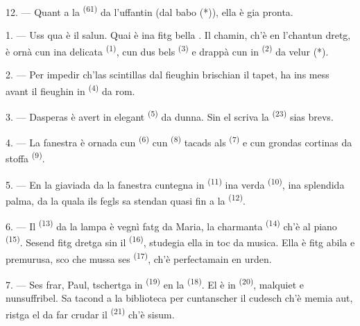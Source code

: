 12. --- Quant a la  \textsuperscript{(61)} da l'uffantin (dal babo (*)),
ella è gia pronta.

\VUsaut{5.0mm}
\VUsaut{3.0mm}

1. --- Uss qua è il salun. Quai è ina fitg bella . Il chamin, ch'è
en l'chantun dretg, è ornà cun ina delicata  \textsuperscript{(1)},
cun dus bels  \textsuperscript{(3)} e drappà cun in 
\textsuperscript{(2)} da velur (*).

2. --- Per impedir ch'las scintillas dal fieughin brischian il tapet, ha ins mess
avant il fieughin in  \textsuperscript{(4)} da rom.

3. --- Dasperas è avert in elegant  \textsuperscript{(5)} da dunna.
Sin el scriva la  \textsuperscript{(23)} sias brevs.

4. --- La fanestra è ornada cun  \textsuperscript{(6)}
cun  \textsuperscript{(8)} tacads als 
\textsuperscript{(7)} e cun grondas cortinas da stoffa 
\textsuperscript{(9)}.

5. --- En la giaviada da la fanestra cuntegna in 
\textsuperscript{(11)} ina verda  \textsuperscript{(10)}, ina
splendida palma, da la quala ils fegls sa stendan quasi fin a la  \textsuperscript{(12)}.

6. --- Il  \textsuperscript{(13)} da la lampa è vegnì fatg da
Maria, la charmanta  \textsuperscript{(14)} ch'è al piano
\textsuperscript{(15)}. Sesend fitg dretga sin il 
\textsuperscript{(16)}, studegia ella in toc da musica. Ella è fitg abila e
premurusa, sco che mussa ses  \textsuperscript{(17)}, ch'è
perfectamain en urden.

\VUsaut{5.0mm}
\VUsaut{3.0mm}

7. --- Ses frar, Paul, tschertga in  \textsuperscript{(19)} en la
 \textsuperscript{(18)}. El è in 
\textsuperscript{(20)}, malquiet e nunsuffribel. Sa tacond a la biblioteca per
cuntanscher il cudesch ch'è memia aut, ristga el da far crudar il 
\textsuperscript{(21)} ch'è sisum.

